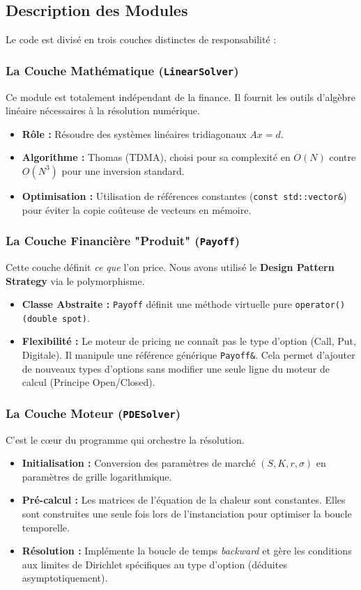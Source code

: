 \documentclass[a4paper,12pt]{article}
\begin{document}
\subsection{Description des Modules}

Le code est divisé en trois couches distinctes de responsabilité :

\subsubsection{ La Couche Mathématique (\texttt{LinearSolver})}
Ce module est totalement indépendant de la finance. Il fournit les outils d'algèbre linéaire nécessaires à la résolution numérique.
\begin{itemize}
    \item \textbf{Rôle :} Résoudre des systèmes linéaires tridiagonaux $Ax=d$.
    \item \textbf{Algorithme :} Thomas (TDMA), choisi pour sa complexité en $O(N)$ contre $O(N^3)$ pour une inversion standard.
    \item \textbf{Optimisation :} Utilisation de références constantes (\texttt{const std::vector\&}) pour éviter la copie coûteuse de vecteurs en mémoire.
\end{itemize}

\subsubsection{ La Couche Financière "Produit" (\texttt{Payoff})}
Cette couche définit \textit{ce que} l'on price. Nous avons utilisé le \textbf{Design Pattern Strategy} via le polymorphisme.
\begin{itemize}
    \item \textbf{Classe Abstraite :} \texttt{Payoff} définit une méthode virtuelle pure \texttt{operator()(double spot)}.
    \item \textbf{Flexibilité :} Le moteur de pricing ne connaît pas le type d'option (Call, Put, Digitale). Il manipule une référence générique \texttt{Payoff\&}. Cela permet d'ajouter de nouveaux types d'options sans modifier une seule ligne du moteur de calcul (Principe Open/Closed).
\end{itemize}

\subsubsection{ La Couche Moteur (\texttt{PDESolver})}
C'est le cœur du programme qui orchestre la résolution.
\begin{itemize}
    \item \textbf{Initialisation :} Conversion des paramètres de marché $(S, K, r, \sigma)$ en paramètres de grille logarithmique.
    \item \textbf{Pré-calcul :} Les matrices de l'équation de la chaleur sont constantes. Elles sont construites une seule fois lors de l'instanciation pour optimiser la boucle temporelle.
    \item \textbf{Résolution :} Implémente la boucle de temps \textit{backward} et gère les conditions aux limites de Dirichlet spécifiques au type d'option (déduites asymptotiquement).
\end{itemize}
\end{document}
